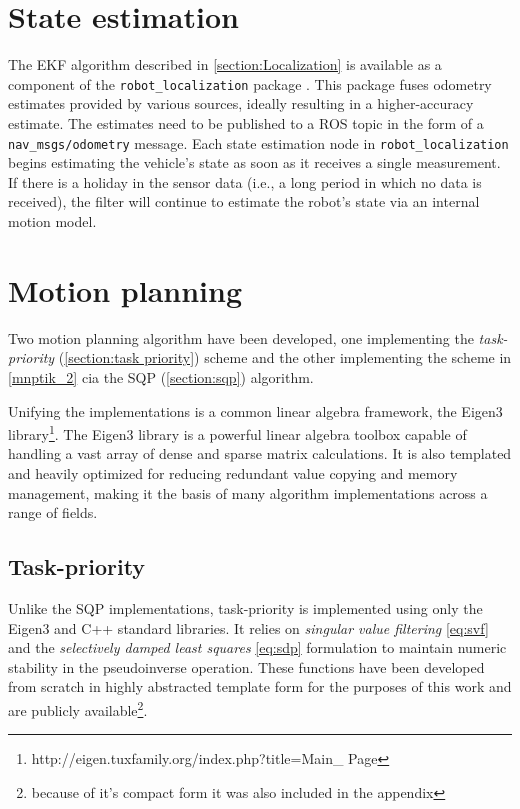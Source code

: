 \documentclass[times, utf8, diplomski, english]{fer}
\begin{document}
\section{State estimation}\label{section:code state estimation}
The EKF algorithm described in \ref{section:Localization} is available as a component of the \verb|robot_localization| package \citep{MooreStouchKeneralizedEkf2014}.
This package fuses odometry estimates provided by various sources, ideally resulting in a higher-accuracy estimate.
The estimates need to be published to a ROS topic in the form of a \verb|nav_msgs/odometry| message.
Each state estimation node in \verb|robot_localization| begins estimating the vehicle’s state as soon as it receives a single measurement. If there is a holiday in the sensor data (i.e., a long period in which no data is received), the filter will continue to estimate the robot’s state via an internal motion model.

\section{Motion planning}\label{section:code motion planning}
Two motion planning algorithm have been developed, one implementing the \textit{task-priority} (\ref{section:task priority}) scheme and the other implementing the scheme in \ref{mnptik_2} cia the SQP (\ref{section:sqp}) algorithm.

Unifying the implementations is a common linear algebra framework, the Eigen3 library\footnote{http://eigen.tuxfamily.org/index.php?title=Main\_ Page}.
The Eigen3 library is a powerful linear algebra toolbox capable of handling a vast array of dense and sparse matrix calculations.
It is also templated and heavily optimized for reducing redundant value copying and memory management, making it the basis of many algorithm implementations across a range of fields.

\subsection{Task-priority}
Unlike the SQP implementations, task-priority is implemented using only the Eigen3 and C++ standard libraries.
It relies on \textit{singular value filtering} \eqref{eq:svf} and the \textit{selectively damped least squares} \eqref{eq:sdp} formulation to maintain numeric stability in the pseudoinverse operation.
These functions have been developed from scratch in highly abstracted template form for the purposes of this work and are publicly available\footnote{because of it's compact form it was also included in the appendix}.
\end{document}

